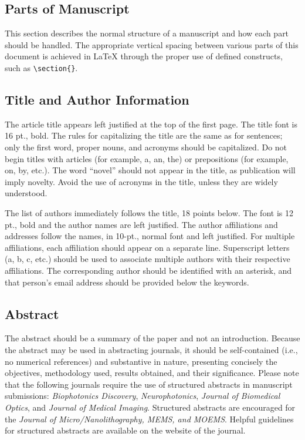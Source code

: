 \documentclass[12pt]{spieman}  %
\begin{document}
\begin{spacing}{2}
\section{Parts of Manuscript}

This section describes the normal structure of a manuscript and how each part should be handled. The appropriate vertical spacing between various parts of this document is achieved in LaTeX through the proper use of defined constructs, such as \verb|\section{}|. 

\subsection{Title and Author Information}
\label{sect:title}
The article title appears left justified at the top of the first page. The title font is 16 pt., bold. The rules for capitalizing the title are the same as for sentences; only the first word, proper nouns, and acronyms should be capitalized. Do not begin titles with articles (for example, a, an, the) or prepositions (for example, on, by, etc.). The word ``novel'' should not appear in the title, as publication will imply novelty. Avoid the use of acronyms in the title, unless they are widely understood.

The list of authors immediately follows the title, 18 points below. The font is 12 pt., bold and the author names are left justified. The author affiliations and addresses follow the names, in 10-pt., normal font and left justified. For multiple affiliations, each affiliation should appear on a separate line. Superscript letters (a, b, c, etc.) should be used to associate multiple authors with their respective affiliations. The corresponding author should be identified with an asterisk, and that person's email address should be provided below the keywords.

\subsection{Abstract}
The abstract should be a summary of the paper and not an introduction. Because the abstract may be used in abstracting journals, it should be self-contained (i.e., no numerical references) and substantive in nature, presenting concisely the objectives, methodology used, results obtained, and their significance. Please note that the following journals require the use of structured abstracts in manuscript submissions: \textit{Biophotonics Discovery}, \textit{Neurophotonics},  \textit{Journal of Biomedical Optics}, and \textit{Journal of Medical Imaging}. Structured abstracts are encouraged for the \textit{Journal of Micro/Nanolithography, MEMS, and MOEMS}. Helpful guidelines for structured abstracts are available on the website of the journal.


\end{spacing}
\end{document}
